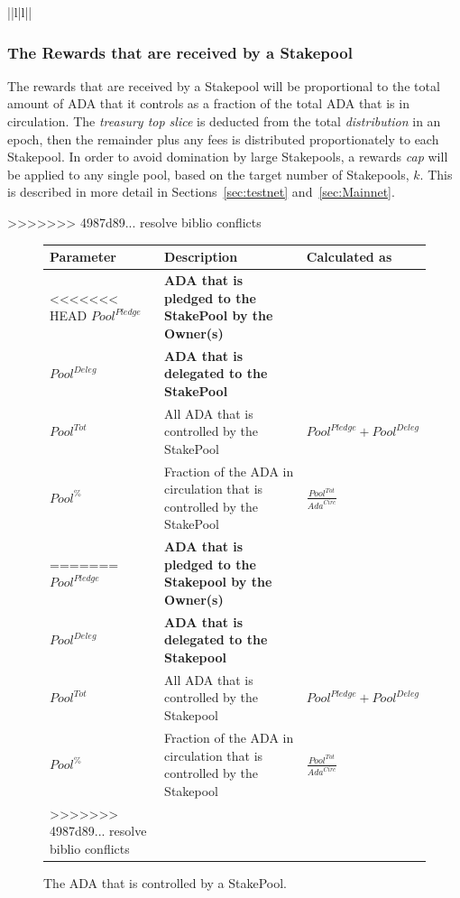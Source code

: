 \documentclass[11pt,a4paper,dvipsnames,twosided,final]{article}
\newcommand{\khcomment}[1]{\todo[color=blue!20]{KH: #1}}
\newcommand{\ada}{ADA{}}
\begin{document}
\begin{tabular}{||l|l||}
\subsubsection*{The Rewards that are received by a Stakepool}

The rewards that are received by a Stakepool will be proportional to the total amount of \ada{} that it controls
as a fraction of the total \ada{} that is in circulation.  The \emph{treasury top slice} is deducted from the total \emph{distribution}
in an epoch, then the remainder plus any fees is distributed proportionately to each Stakepool.  In order to avoid domination by large Stakepools,
a rewards \emph{cap} will be applied to any single pool, based on the target number of Stakepools, $k$.
This is described in more detail in Sections~\ref{sec:testnet} and~\ref{sec:Mainnet}.

>>>>>>> 4987d89... resolve biblio conflicts
\clearpage
\begin{figure}[h!]
\begin{center}
\begin{tabular}{||l|p{9cm}|l||}
  \hline \hline
\textbf{Parameter} & \textbf{Description} & \textbf{Calculated as} \\\hline
<<<<<<< HEAD
\textbf{\color{red} ${\textit{Pool}}^\textit{Pledge}$} & \textbf{\color{red} \ada{} that is pledged to the StakePool by the Owner(s)} & \\\hline
\textbf{\color{blue} ${\textit{Pool}}^\textit{Deleg}$} & \textbf{\color{blue}  \ada{} that is delegated to the StakePool} & \\\hline
${\textit{Pool}}^{Tot}$ & All \ada{} that is controlled by the StakePool & ${\textit{Pool}}^\textit{Pledge} + {\textit{Pool}}^\textit{Deleg}$ \\\hline
${\textit{Pool}}^\%$ & Fraction of the \ada{} in circulation that is controlled by the StakePool & {\large $\frac{{\textit{Pool}}^{Tot}}{\textit{Ada}^{\textit{Circ}}}$} \\\hline
=======
\textbf{\color{red} ${\textit{Pool}}^\textit{Pledge}$} & \textbf{\color{red} \ada{} that is pledged to the Stakepool by the Owner(s)} & \\\hline
\textbf{\color{blue} ${\textit{Pool}}^\textit{Deleg}$} & \textbf{\color{blue}  \ada{} that is delegated to the Stakepool} & \\\hline
${\textit{Pool}}^{Tot}$ & All \ada{} that is controlled by the Stakepool & ${\textit{Pool}}^\textit{Pledge} + {\textit{Pool}}^\textit{Deleg}$ \\\hline
${\textit{Pool}}^\%$ & Fraction of the \ada{} in circulation that is controlled by the Stakepool & {\large $\frac{{\textit{Pool}}^{Tot}}{\textit{Ada}^{\textit{Circ}}}$} \\\hline
>>>>>>> 4987d89... resolve biblio conflicts
  \hline
\end{tabular}
\end{center}
\caption{The \ada{} that is controlled by a StakePool.}
\end{figure}


\end{tabular}
\end{document}

